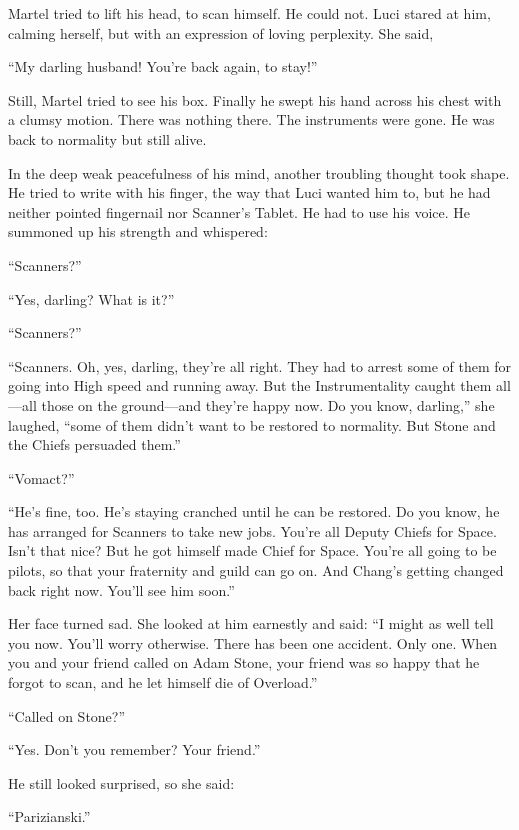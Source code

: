 Martel tried to lift his head, to scan himself. He could not. Luci stared at him, calming herself, but with an expression of loving perplexity. She said,

``My darling husband! You're back again, to stay!''

Still, Martel tried to see his box. Finally he swept his hand across his chest with a clumsy motion. There was nothing there. The instruments were gone. He was back to normality but still alive.

In the deep weak peacefulness of his mind, another troubling thought took shape. He tried to write with his finger, the way that Luci wanted him to, but he had neither pointed fingernail nor Scanner's Tablet. He had to use his voice. He summoned up his strength and whispered:

``Scanners?''

``Yes, darling? What is it?''

``Scanners?''

``Scanners. Oh, yes, darling, they're all right. They had to arrest some of them for going into High speed and running away. But the Instrumentality caught them all---all those on the ground---and they're happy now. Do you know, darling,'' she laughed, ``some of them didn't want to be restored to normality. But Stone and the Chiefs persuaded them.''

``Vomact?''

``He's fine, too. He's staying cranched until he can be restored. Do you know, he has arranged for Scanners to take new jobs. You're all Deputy Chiefs for Space. Isn't that nice? But he got himself made Chief for Space. You're all going to be pilots, so that your fraternity and guild can go on. And Chang's getting changed back right now. You'll see him soon.''

Her face turned sad. She looked at him earnestly and said: ``I might as well tell you now. You'll worry otherwise. There has been one accident. Only one. When you and your friend called on Adam Stone, your friend was so happy that he forgot to scan, and he let himself die of Overload.''

``Called on Stone?''

``Yes. Don't you remember? Your friend.''

He still looked surprised, so she said:

``Parizianski.''
